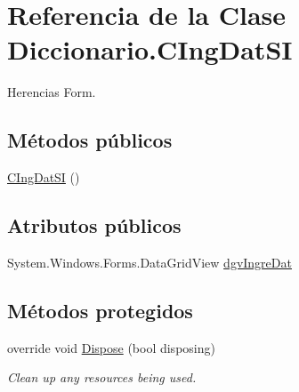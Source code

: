 \hypertarget{class_diccionario_1_1_c_ing_dat_s_i}{\section{Referencia de la Clase Diccionario.\-C\-Ing\-Dat\-S\-I}
\label{class_diccionario_1_1_c_ing_dat_s_i}
}


Herencias Form.

\subsection*{Métodos públicos}
\begin{DoxyCompactItemize}
\item 
\hyperlink{class_diccionario_1_1_c_ing_dat_s_i_a72c688d49b21ccde9a59afa4ed75c89b}{C\-Ing\-Dat\-S\-I} ()
\end{DoxyCompactItemize}
\subsection*{Atributos públicos}
\begin{DoxyCompactItemize}
\item 
System.\-Windows.\-Forms.\-Data\-Grid\-View \hyperlink{class_diccionario_1_1_c_ing_dat_s_i_af0aabb1ce087b94757d8c1bec98fccde}{dgv\-Ingre\-Dat}
\end{DoxyCompactItemize}
\subsection*{Métodos protegidos}
\begin{DoxyCompactItemize}
\item 
override void \hyperlink{class_diccionario_1_1_c_ing_dat_s_i_af2fb2cd755517f27ed38f72952eab362}{Dispose} (bool disposing)
\begin{DoxyCompactList}\small\item\em Clean up any resources being used. \end{DoxyCompactList}\end{DoxyCompactItemize}
